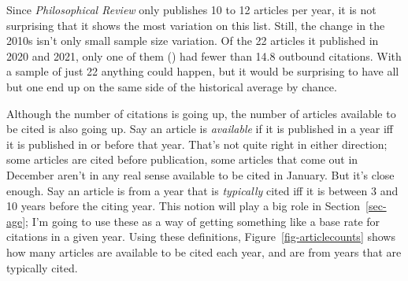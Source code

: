 \documentclass[
  12pt,
  letterpaper,
  DIV=11,
  numbers=noendperiod]{scrartcl}
\begin{document}
Since \emph{Philosophical Review} only publishes 10 to 12 articles per
year, it is not surprising that it shows the most variation on this
list. Still, the change in the 2010s isn't only small sample size
variation. Of the 22 articles it published in 2020 and 2021, only one of
them () had fewer than
14.8 outbound citations. With a sample of just 22 anything could happen,
but it would be surprising to have all but one end up on the same side
of the historical average by chance.

Although the number of citations is going up, the number of articles
available to be cited is also going up. Say an article is
\emph{available} if it is published in a year iff it is published in or
before that year. That's not quite right in either direction; some
articles are cited before publication, some articles that come out in
December aren't in any real sense available to be cited in January. But
it's close enough. Say an article is from a year that is
\emph{typically} cited iff it is between 3 and 10 years before the
citing year. This notion will play a big role in Section~\ref{sec-age};
I'm going to use these as a way of getting something like a base rate
for citations in a given year. Using these definitions,
Figure~\ref{fig-articlecounts} shows how many articles are available to
be cited each year, and are from years that are typically cited.
\end{document}
